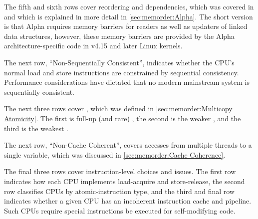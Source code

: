 The fifth and sixth rows cover reordering and dependencies,
which was covered in
and which is explained in more detail in
\cref{sec:memorder:Alpha}.
The short version is that Alpha requires memory barriers for readers
as well as updaters of linked data structures, however, these memory
barriers are provided by the Alpha architecture-specific code in
v4.15 and later Linux kernels.

The next row, ``Non-Sequentially Consistent'', indicates whether
the CPU's normal load and store instructions are constrained by
sequential consistency.
Performance considerations have dictated that no modern mainstream
system is sequentially consistent.

The next three rows cover ,
which was defined in
\cref{sec:memorder:Multicopy Atomicity}.
The first is full-up (and rare)
, the second is the
weaker ,
and the third is the weakest
.

The next row, ``Non-Cache Coherent'', covers accesses from multiple
threads to a single variable, which was discussed in
\cref{sec:memorder:Cache Coherence}.

The final three rows cover instruction-level choices and issues.
The first row indicates how each CPU implements load-acquire
and store-release, the second row classifies CPUs by atomic-instruction
type, and the third and final row
indicates whether a given CPU has an incoherent
instruction cache and pipeline.
Such CPUs require special instructions be executed for self-modifying
code.


